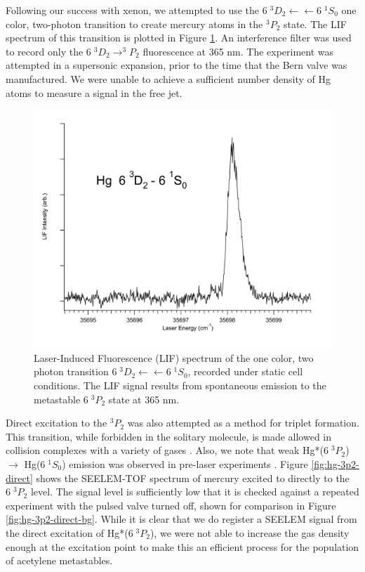 \documentclass[12pt]{mitthesis}
\begin{document}
Following our success with xenon, we attempted to use the $6\;^3D_2
\leftarrow \leftarrow 6\;^1S_0$ one color, two-photon transition to
create mercury atoms in the $^3P_2$ state.  The LIF spectrum of this
transition is plotted in Figure \ref{fig:hg3d2-cell}.  An interference
filter was used to record only the $6 \; ^3D_2 \rightarrow ^3P_2$
fluorescence at 365 nm.  The experiment was attempted in a supersonic
expansion, prior to the time that the Bern valve was manufactured.  We
were unable to achieve a sufficient number density of Hg atoms to
measure a signal in the free jet.

\begin{figure}
  \caption{Laser-Induced Fluorescence (LIF) spectrum of the one color,
    two photon transition  $6\;^3D_2 \leftarrow \leftarrow
    6\;^1S_0$, recorded under static cell conditions.  The LIF signal
    results from spontaneous emission to the metastable $6\;^3P_2$
    state at 365 nm.}
  \label{fig:hg3d2-cell}
  \centering
  \vspace{1cm}
  \includegraphics[width=6in]{Hg3D2-cell.pdf}
  \vspace{1cm}
\end{figure}

Direct excitation to the $^3P_2$ was also attempted as a method for
triplet formation.  This transition, while forbidden in the solitary
molecule, is made allowed in collision complexes with a variety of
gases \cite{kurosawa98, amano98}.  Also, we note that weak Hg*($6 \; ^3P_2$)
$\rightarrow$ Hg($6 \; ^1S_0$) emission was observed in pre-laser
experiments \cite{mrozowski45}.  Figure \ref{fig:hg-3p2-direct} shows
the SEELEM-TOF spectrum of mercury excited to directly to the $6 \;
^3P_2$ level.  The signal level is sufficiently low that it is checked
against a repeated experiment with the pulsed valve turned off, shown
for comparison in Figure \ref{fig:hg-3p2-direct-bg}.  While it is
clear that we do register a SEELEM signal from the direct excitation
of Hg*($6 \; ^3P_2$), we were not able to increase the gas density
enough at the excitation point to make this an efficient process for
the population of acetylene metastables.
\end{document}
